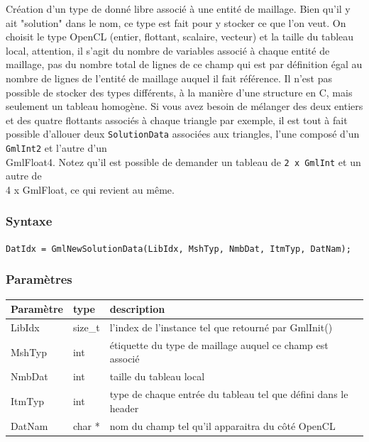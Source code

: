 \documentclass[a4paper,12pt]{article}
\begin{document}
Création d'un type de donné libre associé à une entité de maillage.
Bien qu'il y ait "solution" dans le nom, ce type est fait pour y stocker ce que l'on veut.
On choisit le type OpenCL (entier, flottant, scalaire, vecteur) et la taille du tableau local, attention, il s'agit du nombre de variables associé à chaque entité de maillage, pas du nombre total de lignes de ce champ qui est par définition égal au nombre de lignes de l'entité de maillage auquel il fait référence.
Il n'est pas possible de stocker des types différents, à la manière d'une structure en C, mais seulement un tableau homogène. Si vous avez besoin de mélanger des deux entiers et des quatre flottants associés à chaque triangle par exemple, il est tout à fait possible d'allouer deux {\tt SolutionData} associées aux triangles, l'une composé d'un {\tt GmlInt2} et l'autre d'un {\\ GmlFloat4}. Notez qu'il est possible de demander un tableau de {\tt 2 x GmlInt} et un autre de {\\ 4 x GmlFloat}, ce qui revient au même.

\subsubsection*{Syntaxe}

{\tt DatIdx = GmlNewSolutionData(LibIdx, MshTyp, NmbDat, ItmTyp, DatNam);}

\subsubsection*{Paramètres}

\begin{tabular}{|m{2cm}|m{1.5cm}|m{10.5cm}|}
\hline
Paramètre  & type    & description \\
\hline
LibIdx     & size\_t & l'index de l'instance tel que retourné par GmlInit() \\
\hline
MshTyp     & int     & étiquette du type de maillage auquel ce champ est associé \\
\hline
NmbDat     & int     & taille du tableau local \\
\hline
ItmTyp     & int     & type de chaque entrée du tableau tel que défini dans le header \\
\hline
DatNam     & char *  & nom du champ tel qu'il apparaitra du côté OpenCL \\
\hline
\end{tabular}

\medskip
\end{document}
